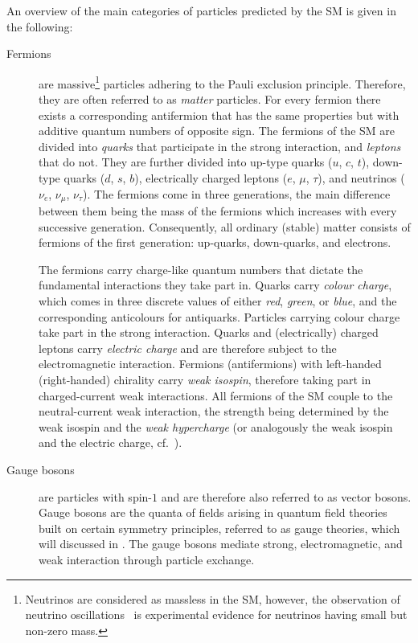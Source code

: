 An overview of the main categories of particles predicted by the SM is given in
the following:
\begin{description}

\item[Fermions] are massive\footnote{Neutrinos are considered as massless in the
    SM, however, the observation of neutrino
    oscillations~\cite{Super-Kamiokande:1998kpq,SNO:2002tuh} is experimental
    evidence for neutrinos having small but non-zero mass.} particles adhering
  to the Pauli exclusion principle. Therefore, they are often referred to as
  \emph{matter} particles. For every fermion there exists a corresponding
  antifermion that has the same properties but with additive quantum numbers of
  opposite sign. The fermions of the SM are divided into \emph{quarks} that
  participate in the strong interaction, and \emph{leptons} that do not. They
  are further divided into up-type quarks ($u$, $c$, $t$), down-type quarks
  ($d$, $s$, $b$), electrically charged leptons ($e$, $\mu$, $\tau$), and
  neutrinos ($\nu_e$, $\nu_\mu$, $\nu_\tau$). The fermions come in three
  generations, the main difference between them being the mass of the fermions
  which increases with every successive generation. Consequently, all ordinary
  (stable) matter consists of fermions of the first generation: up-quarks,
  down-quarks, and electrons.

  The fermions carry charge-like quantum numbers that dictate the fundamental
  interactions they take part in. Quarks carry \emph{colour charge}, which comes
  in three discrete values of either \emph{red}, \emph{green}, or \emph{blue},
  and the corresponding anticolours for antiquarks. Particles carrying colour
  charge take part in the strong interaction. Quarks and (electrically) charged
  leptons carry \emph{electric charge} and are therefore subject to the
  electromagnetic interaction. Fermions (antifermions) with left-handed
  (right-handed) chirality carry \emph{weak isospin}, therefore taking part in
  charged-current weak interactions. All fermions of the SM couple to the
  neutral-current weak interaction, the strength being determined by the weak
  isospin and the \emph{weak hypercharge} (or analogously the weak isospin and
  the electric charge, cf.~).

\item[Gauge bosons] are particles with spin-$1$ and are therefore also referred
  to as vector bosons. Gauge bosons are the quanta of fields arising in quantum
  field theories built on certain symmetry principles, referred to as gauge
  theories, which will discussed in . The
  gauge bosons mediate strong, electromagnetic, and weak interaction through
  particle exchange.


\end{description}
